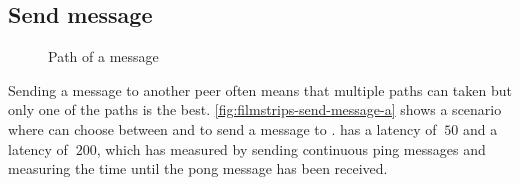 \subsection{Send message}

\begin{figure}[htb!]
  \centering
	\caption{Path of a message}
\label{fig:filmstrips-send-message}
\end{figure}

Sending a message to another peer often means that multiple paths can taken but only one of the paths is the best. \vref{fig:filmstrips-send-message-a} shows a scenario where \bob can choose between \don and \claire to send a message to \alice. \don has a latency of $\ 50 $ and \claire a latency of $\ 200 $, which \bob has measured by sending continuous ping messages and measuring the time until the pong message has been received.

